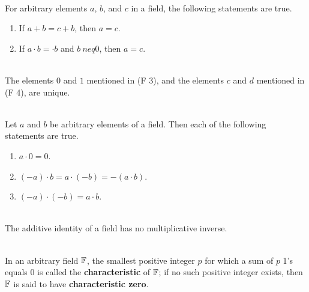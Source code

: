 \begin{alphasection}
	\begin{theorem}
		\hfill\\
		For arbitrary elements $a$, $b$, and $c$ in a field, the following statements are true.

		\begin{enumerate}
			\item If $a + b = c + b$, then $a=c$.
			\item If $a \cdot b = \cdot b$ and $b\ neq 0$, then $a=c$.
		\end{enumerate}
	\end{theorem}

	\begin{corollary}
		\hfill\\
		The elements $0$ and $1$ mentioned in (F 3), and the elements $c$ and $d$ mentioned in (F 4), are unique.
	\end{corollary}

	\begin{theorem}
		\hfill\\
		Let $a$ and $b$ be arbitrary elements of a field. Then each of the following statements are true.

		\begin{enumerate}
			\item $a \cdot 0 = 0$.
			\item $(-a)\cdot b = a \cdot(-b) = -(a \cdot b)$.
			\item $(-a) \cdot (-b) = a \cdot b$.
		\end{enumerate}
	\end{theorem}

	\begin{corollary}
		\hfill\\
		The additive identity of a field has no multiplicative inverse.
	\end{corollary}

	\begin{definition}
		\hfill\\
		In an arbitrary field $\mathbb{F}$, the smallest positive integer $p$ for which a sum of $p$ 1's equals 0 is called the \textbf{characteristic} of $\mathbb{F}$; if no such positive integer exists, then $\mathbb{F}$ is said to have \textbf{characteristic zero}.
	\end{definition}
\end{alphasection}

